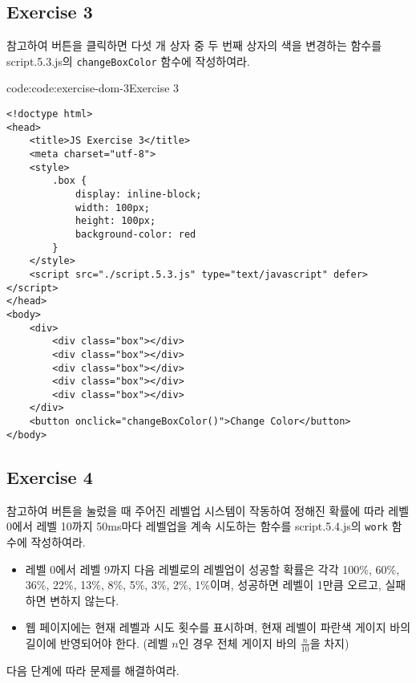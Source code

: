 \subsection*{Exercise 3}

\을 참고하여 버튼을 클릭하면 다섯 개 상자 중 두 번째 상자의 색을 변경하는 함수를 script.5.3.js의 \texttt{changeBoxColor} 함수에 작성하여라.

\begin{codeenv}{code:code:exercise-dom-3}{Exercise 3}\begin{verbatim}
<!doctype html>
<head>
    <title>JS Exercise 3</title>
    <meta charset="utf-8">
    <style>
        .box {
            display: inline-block;
            width: 100px;
            height: 100px;
            background-color: red
        }
    </style>
    <script src="./script.5.3.js" type="text/javascript" defer></script>
</head>
<body>
    <div>
        <div class="box"></div>
        <div class="box"></div>
        <div class="box"></div>
        <div class="box"></div>
        <div class="box"></div>
    </div>
    <button onclick="changeBoxColor()">Change Color</button>
</body>
\end{verbatim}
\end{codeenv}

\subsection*{Exercise 4}

\을 참고하여 버튼을 눌렀을 때 주어진 레벨업 시스템이 작동하여 정해진 확률에 따라 레벨 0에서 레벨 10까지 50ms마다 레벨업을 계속 시도하는 함수를 script.5.4.js의 \texttt{work} 함수에 작성하여라.

\begin{itemize}
    \item 레벨 0에서 레벨 9까지 다음 레벨로의 레벨업이 성공할 확률은 각각 100\%, 60\%, 36\%, 22\%, 13\%, 8\%, 5\%, 3\%, 2\%, 1\%이며, 성공하면 레벨이 1만큼 오르고, 실패하면 변하지 않는다.
    \item 웹 페이지에는 현재 레벨과 시도 횟수를 표시하며, 현재 레벨이 파란색 게이지 바의 길이에 반영되어야 한다.  (레벨 $n$인 경우 전체 게이지 바의 $\frac n {10}$을 차지)
\end{itemize}

다음 단계에 따라 문제를 해결하여라.

